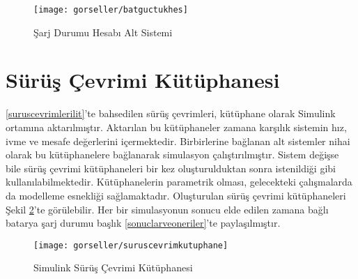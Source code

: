 \begin{figure}[h]
    \centering
    \texttt{[image: gorseller/batguctukhes]}
    \caption{Şarj Durumu Hesabı Alt Sistemi}\label{fig:soccalc}
\end{figure}

\section{Sürüş Çevrimi Kütüphanesi}
\ref{suruscevrimlerilit}'te bahsedilen sürüş çevrimleri, kütüphane olarak Simulink ortamına aktarılmıştır. Aktarılan bu kütüphaneler zamana karşılık sistemin hız, ivme ve mesafe değerlerini içermektedir. Birbirlerine bağlanan alt sistemler nihai olarak
bu kütüphanelere bağlanarak simulasyon çalıştırılmıştır. 
Sistem değişse bile sürüş çevrimi kütüphaneleri bir kez oluşturulduktan sonra istenildiği gibi kullanılabilmektedir. Kütüphanelerin parametrik olması, 
gelecekteki çalışmalarda da modelleme esnekliği sağlamaktadır.
Oluşturulan sürüş çevrimi kütüphaneleri Şekil \ref{fig:suruscevrimkutuphane}'te görülebilir. Her bir simulasyonun sonucu elde edilen zamana bağlı batarya şarj
durumu başlık \ref{sonuclarveoneriler}'te paylaşılmıştır.

\begin{figure}[h]
    \centering
    \texttt{[image: gorseller/suruscevrimkutuphane]}
    \caption{Simulink Sürüş Çevrimi Kütüphanesi}\label{fig:suruscevrimkutuphane}
\end{figure}



 